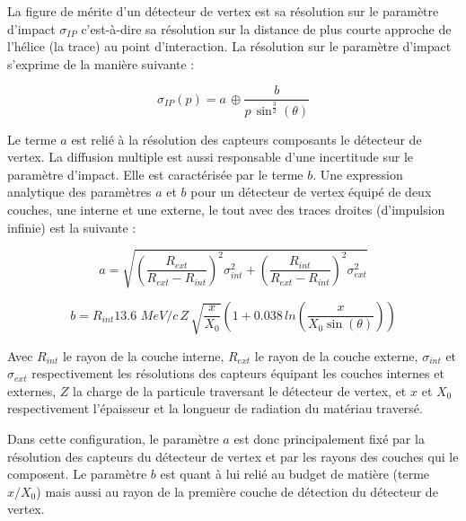    La figure de m\'erite d'un d\'etecteur de vertex est sa r\'esolution sur le param\`etre d'impact $\sigma_{IP}$ c'est-\`a-dire sa résolution sur la distance de plus courte approche de l'h\'elice (la trace) au point d'interaction. La r\'esolution sur le param\`etre d'impact s'exprime de la mani\`ere suivante : 
   
   \begin{equation}
    \sigma_{IP}(p) = a \, \oplus \dfrac{b}{p \, \sin^{\frac{3}{2}}(\theta) }
   \end{equation}

   Le terme $a$ est reli\'e \`a la résolution des capteurs composants le d\'etecteur de vertex. La diffusion multiple est aussi responsable d'une incertitude sur le param\`etre d'impact. Elle est caract\'eris\'ee par le terme $b$. Une expression analytique des param\`etres $a$ et $b$ pour un d\'etecteur de vertex \'equip\'e de deux couches, une interne et une externe, le tout avec des traces droites (d'impulsion infinie) est la suivante :
   
   \begin{equation}
    a = \sqrt{ \left( \dfrac{R_{ext}}{R_{ext}-R_{int}} \right)^2 \sigma_{int}^2 + \left( \dfrac{R_{int}}{R_{ext}-R_{int}} \right)^2 \sigma_{ext}^2 }
   \end{equation}
   
   \begin{equation}
    b = R_{int} 13.6 \, \, MeV/c \, Z \, \sqrt{\dfrac{x}{X_0}} \left(1 + 0.038  \, ln \left(\dfrac{x}{X_0 \sin(\theta)}\right) \right)
   \end{equation}

   Avec $R_{int}$ le rayon de la couche interne, $R_{ext}$ le rayon de la couche externe, $\sigma_{int}$ et $\sigma_{ext}$ respectivement les r\'esolutions des capteurs \'equipant les couches internes et externes, $Z$ la charge de la particule traversant le d\'etecteur de vertex, et $x$ et $X_0$ respectivement l'\'epaisseur et la longueur de radiation du mat\'eriau travers\'e.
   
   \medskip
   
   Dans cette configuration, le param\`etre $a$ est donc principalement fix\'e par la r\'esolution des capteurs du d\'etecteur de vertex et par les rayons des couches qui le composent. Le param\`etre $b$ est quant \`a lui reli\'e au budget de mati\`ere (terme $x/X_0$) mais aussi au rayon de la premi\`ere couche de d\'etection du d\'etecteur de vertex.
   
   \medskip
   
